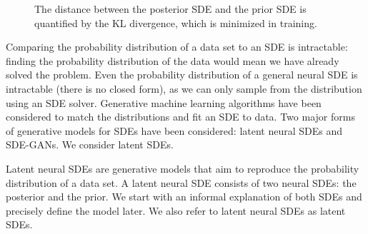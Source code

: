 \documentclass[twoside,11pt]{article}
\begin{document}
\begin{figure}
\begin{center}
\end{center}
\caption{The distance between the posterior SDE and the prior SDE is quantified by the KL divergence, which is minimized in training.} 
\label{fig:prior}
\end{figure}

Comparing the probability distribution of a data set to an SDE is intractable: finding the probability distribution of the data would mean we have already solved the problem. Even the probability distribution of a general neural SDE is intractable (there is no closed form), as we can only sample from the distribution using an SDE solver. Generative machine learning algorithms have been considered to match the distributions and fit an SDE to data. Two major forms of generative models for SDEs have been considered: latent neural SDEs and SDE-GANs. We consider latent SDEs.

Latent neural SDEs \citep{li2020scalable} \cite[see also][82-84]{kidgerthesis} are generative models that aim to reproduce the probability distribution of a data set. A latent neural SDE consists of two neural SDEs: the posterior and the prior. We start with an informal explanation of both SDEs and precisely define the model later. We also refer to latent neural SDEs as latent SDEs.
\end{document}
